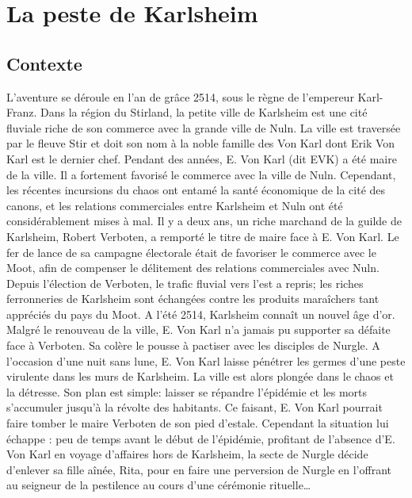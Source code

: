\documentclass[french,oneside]{wfrp}
\begin{document}
\chapter{La peste de Karlsheim}
\label{chap:la-peste-de-karlsheim}

\section{Contexte}
\label{sec:contexte}

L’aventure se déroule en l’an de grâce 2514, sous le règne de
l’empereur Karl-Franz.  Dans la région du Stirland, la petite ville de
Karlsheim est une cité fluviale riche de son commerce avec la grande
ville de Nuln. La ville est traversée par le fleuve Stir et doit son
nom à la noble famille des Von Karl dont Erik Von Karl est le dernier
chef. Pendant des années, E. Von Karl (dit EVK) a été maire de la
ville. Il a fortement favorisé le commerce avec la ville de
Nuln. Cependant, les récentes incursions du chaos ont entamé la santé
économique de la cité des canons, et les relations commerciales entre
Karlsheim et Nuln ont été considérablement mises à mal. Il y a deux
ans, un riche marchand de la guilde de Karlsheim, Robert Verboten, a
remporté le titre de maire face à E. Von Karl. Le fer de lance de sa
campagne électorale était de favoriser le commerce avec le Moot, afin
de compenser le délitement des relations commerciales avec
Nuln. Depuis l’élection de Verboten, le trafic fluvial vers l’est a
repris; les riches ferronneries de Karlsheim sont échangées contre les
produits maraîchers tant appréciés du pays du Moot. A l’été 2514,
Karlsheim connaît un nouvel âge d’or. \\

Malgré le renouveau de la ville, E. Von Karl n’a jamais pu supporter
sa défaite face à Verboten. Sa colère le pousse à pactiser avec les
disciples de Nurgle. A l’occasion d’une nuit sans lune, E. Von Karl
laisse pénétrer les germes d’une peste virulente dans les murs de
Karlsheim. La ville est alors plongée dans le chaos et la
détresse. Son plan est simple: laisser se répandre l’épidémie et les
morts s’accumuler jusqu’à la révolte des habitants. Ce faisant, E. Von
Karl pourrait faire tomber le maire Verboten de son pied d’estale.
Cependant la situation lui échappe : peu de temps avant le début de
l’épidémie, profitant de l’absence d’E. Von Karl en voyage d'affaires
hors de Karlsheim, la secte de Nurgle décide d’enlever sa fille aînée,
Rita, pour en faire une perversion de Nurgle en l'offrant au seigneur
de la pestilence au cours d’une cérémonie rituelle\dots
\end{document}

